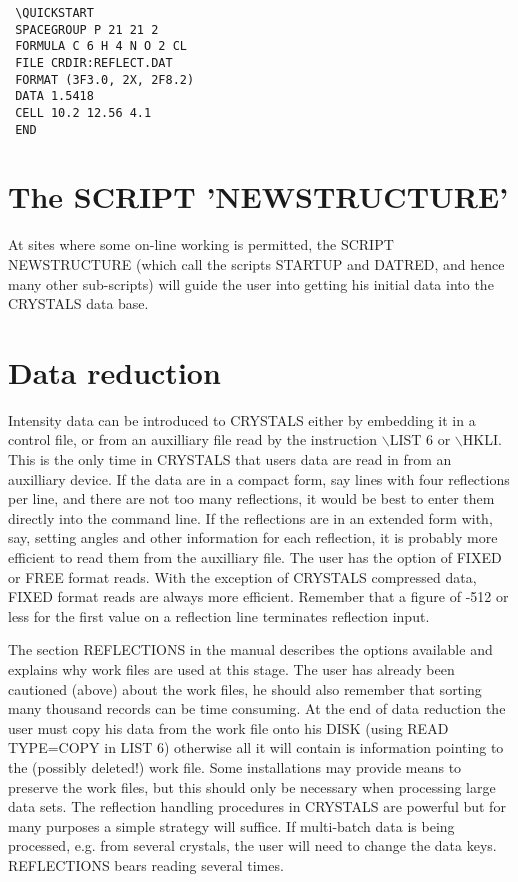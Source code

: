 \documentclass[10pt,a4paper]{report}
\begin{document}
\small\begin{verbatim}
 \QUICKSTART
 SPACEGROUP P 21 21 2
 FORMULA C 6 H 4 N O 2 CL
 FILE CRDIR:REFLECT.DAT
 FORMAT (3F3.0, 2X, 2F8.2)
 DATA 1.5418
 CELL 10.2 12.56 4.1
 END
\end{verbatim}\normalsize





\section{The SCRIPT 'NEWSTRUCTURE'}





At sites where some on-line working is permitted, the SCRIPT NEWSTRUCTURE
 (which call the scripts STARTUP and DATRED, and hence many other sub-scripts)
 will guide the user into getting his initial data into the 
 CRYSTALS data base.



\section{Data reduction}





Intensity data can be introduced to CRYSTALS either by embedding it in a 
 control file, or from an auxilliary file read by the instruction $\backslash$LIST 6 or
 $\backslash$HKLI. This is the only time in CRYSTALS that users data are read in
 from an auxilliary device. If the data are in a compact form,
 say lines with four reflections
 per line, and there are not too many reflections, it would be best to enter them directly into the command line. If the reflections are in an extended form
 with, say, setting angles and other information for each
 reflection, it is probably more efficient to read them from the auxilliary 
 file. The user has the option of FIXED or FREE format
 reads. With the exception of CRYSTALS compressed data, FIXED format reads
 are always more efficient. Remember that a figure of -512 or less for
 the first value on a reflection line terminates reflection input.


The section REFLECTIONS in the manual describes the options available
 and explains why work files are used at this stage. The user has already
 been cautioned (above) about the work files, he should also remember that
 sorting many thousand records can be time consuming. At the end of data
 reduction the user must copy his data from the work file onto his DISK
 (using READ TYPE=COPY in LIST 6)
 otherwise all it will contain is information pointing to the (possibly
 deleted!) work file. Some installations may provide means to preserve
 the work files, but this should only be necessary when processing large
 data sets. The reflection handling procedures in CRYSTALS are powerful
 but for many purposes a simple strategy will suffice. If multi-batch
 data is being processed, e.g. from several crystals, the user will need
 to change the data keys.
 REFLECTIONS bears reading several times.
\end{document}

